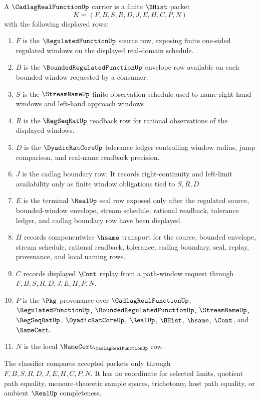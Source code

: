 \begin{definition}
\label{def:cadlag-real-function-carrier}
A $\CadlagRealFunctionUp$ carrier is a finite $\BHist$ packet
$$
K=(F,B,S,R,D,J,E,H,C,P,N)
$$
with the following displayed rows:
\begin{enumerate}
\item $F$ is the $\RegulatedFunctionUp$ source row, exposing finite one-sided regulated windows on the displayed real-domain schedule.
\item $B$ is the $\BoundedRegulatedFunctionUp$ envelope row available on each bounded window requested by a consumer.
\item $S$ is the $\StreamNameUp$ finite observation schedule used to name right-hand windows and left-hand approach windows.
\item $R$ is the $\RegSeqRatUp$ readback row for rational observations of the displayed windows.
\item $D$ is the $\DyadicRatCoreUp$ tolerance ledger controlling window radius, jump comparison, and real-name readback precision.
\item $J$ is the cadlag boundary row. It records right-continuity and left-limit availability only as finite window obligations tied to $S,R,D$.
\item $E$ is the terminal $\RealUp$ seal row exposed only after the regulated source, bounded-window envelope, stream schedule, rational readback, tolerance ledger, and cadlag boundary row have been displayed.
\item $H$ records componentwise $\hsame$ transport for the source, bounded envelope, stream schedule, rational readback, tolerance, cadlag boundary, seal, replay, provenance, and local naming rows.
\item $C$ records displayed $\Cont$ replay from a path-window request through $F,B,S,R,D,J,E,H,P,N$.
\item $P$ is the $\Pkg$ provenance over $\CadlagRealFunctionUp$, $\RegulatedFunctionUp$, $\BoundedRegulatedFunctionUp$, $\StreamNameUp$, $\RegSeqRatUp$, $\DyadicRatCoreUp$, $\RealUp$, $\BHist$, $\hsame$, $\Cont$, and $\NameCert$.
\item $N$ is the local $\NameCert_{\CadlagRealFunctionUp}$ row.
\end{enumerate}
The classifier compares accepted packets only through $F,B,S,R,D,J,E,H,C,P,N$. It has no coordinate for selected limits, quotient path equality, measure-theoretic sample spaces, trichotomy, host path equality, or ambient $\RealUp$ completeness.
\end{definition}

